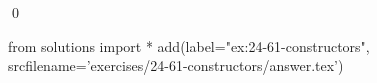 
\begin{ex}
  \label{ex:24-61-constructors}
  
  \qed
\end{ex}
\begin{python0}
from solutions import *
add(label="ex:24-61-constructors",
    srcfilename='exercises/24-61-constructors/answer.tex')
\end{python0}
